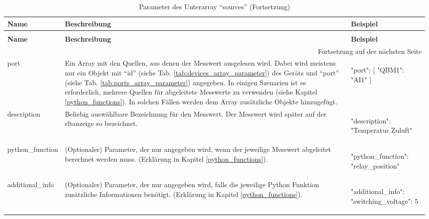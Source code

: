 \begin{enumerate}
   
\begin{longtable}{p{} p{} | p{}}
    \caption{Parameter des Unterarray \enquote{sources}}
    \label{tab:sources_array_parameter}
    \\ \toprule
    \textbf{Name} & \textbf{Beschreibung} & \textbf{Beispiel}
    \\ \midrule
    \endfirsthead
    \caption{Parameter des Unterarray \enquote{sources} (Fortsetzung)}
    \\ \toprule
    \textbf{Name} & \textbf{Beschreibung} & \textbf{Beispiel}
    \\ \midrule
    \endhead
    \midrule
    \multicolumn{3}{r}{{Fortsetzung auf der nächsten Seite}} 
    \\ \bottomrule
    \endfoot
    \bottomrule
    \endlastfoot
    port & Ein Array mit den Quellen, aus denen der Messwert ausgelesen wird. Dabei wird meistens nur ein Objekt mit \enquote{id} (siehe Tab. \ref{tab:devices_array_parameter}) des Geräts und \enquote{port} (siehe Tab. \ref{tab:ports_array_parameter}) angegeben. In einigen Szenarien ist es erforderlich, mehrere Quellen für abgeleitete Messwerte zu verwenden (siehe Kapitel \ref{python_functions}). In solchen Fällen werden dem Array zusätzliche Objekte hinzugefügt. &  
    \begin{jsonTable}
"port": [
{ "QBM1": "AI1" }
]
    \end{jsonTable} 
    \\
    description         & Beliebig auswählbare Bezeichnung für den Messwert. Der Messwert wird später auf der \acs{rltanzeige} so bezeichnet. & 
    \begin{jsonTable}
"description": "Temperatur Zuluft"
    \end{jsonTable}  
    \\
    python\_function    & (Optionaler) Parameter, der nur angegeben wird, wenn der jeweilige Messwert abgeleitet berechnet werden muss. (Erklärung in Kapitel \ref{python_functions}). & 
    \begin{jsonTable}
"python_function": "relay_position"
    \end{jsonTable} 
    \\
    additional\_info    & (Optionaler) Parameter, der nur angegeben wird, falls die jeweilige Python Funktion zusätzliche Informationen benötigt. (Erklärung in Kapitel \ref{python_functions}). & 
    \begin{jsonTable}
"additional_info": { "switching_voltage": 5 }
    \end{jsonTable} 
    \\
\end{longtable}
					
\end{enumerate}

